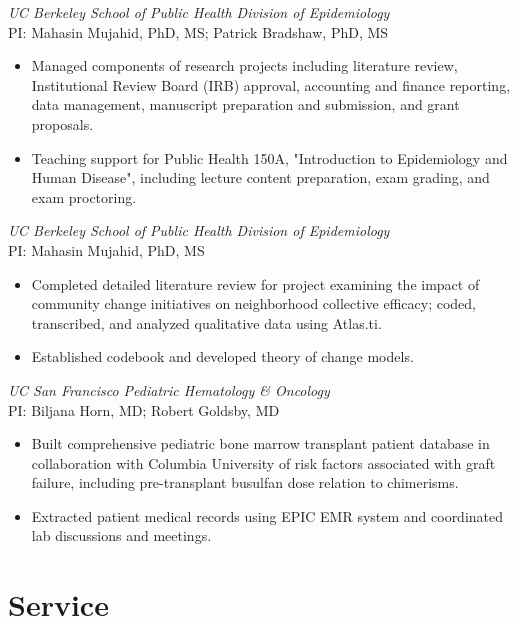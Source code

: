 \documentclass{cv_style}
\begin{document}
\textit{UC Berkeley School of Public Health Division of Epidemiology} \\
PI: Mahasin Mujahid, PhD, MS; Patrick Bradshaw, PhD, MS
\begin{itemize}
    \item Managed components of research projects including literature review, Institutional Review Board (IRB) approval, accounting and finance reporting, data management, manuscript preparation and submission, and grant proposals.
    \item \parskip 1pt Teaching support for Public Health 150A, "Introduction to Epidemiology and Human Disease", including lecture content preparation, exam grading, and exam proctoring.
\end{itemize}

\textit{UC Berkeley School of Public Health Division of Epidemiology} \\
PI: Mahasin Mujahid, PhD, MS
\begin{itemize}
    \item Completed detailed literature review for project examining the impact of community change initiatives on neighborhood collective efficacy; coded, transcribed, and analyzed qualitative data using Atlas.ti.
    \item \parskip 1pt Established codebook and developed theory of change models.
\end{itemize}

\textit{UC San Francisco Pediatric Hematology \& Oncology} \\
PI: Biljana Horn, MD; Robert Goldsby, MD
\begin{itemize}
    \item Built comprehensive pediatric bone marrow transplant patient database in collaboration with Columbia University of risk factors associated with graft failure, including pre-transplant busulfan dose relation to chimerisms.
    \item \parskip 1pt Extracted patient medical records using EPIC EMR system and coordinated lab discussions and meetings.
\end{itemize}

\nocite{*}
\printbibliography[title=Publications]

\section{Service}
\end{document}
